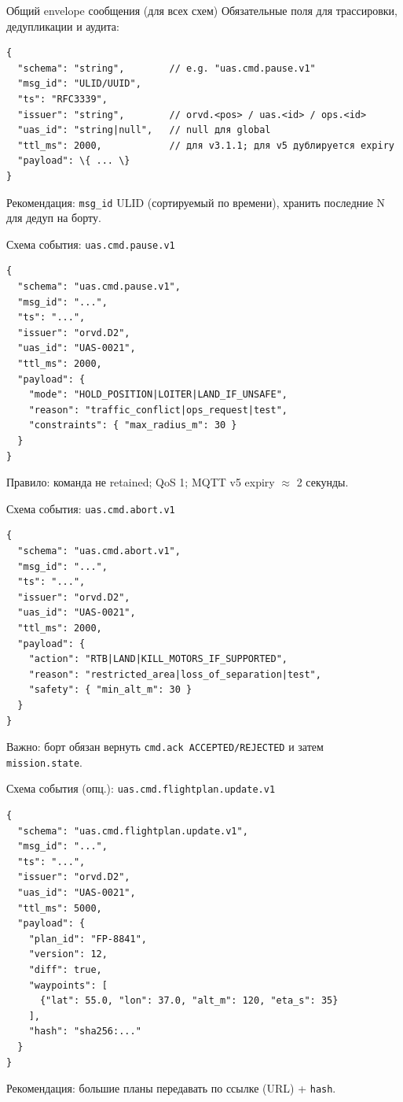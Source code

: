 \documentclass[aspectratio=169]{beamer}
\begin{document}
\begin{frame}[fragile]{Общий envelope сообщения (для всех схем)}
\small
Обязательные поля для трассировки, дедупликации и аудита:
\begin{Verbatim}[fontsize=\scriptsize, baselinestretch=0.85]
{
  "schema": "string",        // e.g. "uas.cmd.pause.v1"
  "msg_id": "ULID/UUID",
  "ts": "RFC3339",
  "issuer": "string",        // orvd.<pos> / uas.<id> / ops.<id>
  "uas_id": "string|null",   // null для global
  "ttl_ms": 2000,            // для v3.1.1; для v5 дублируется expiry
  "payload": \{ ... \}
}
\end{Verbatim}
Рекомендация: \texttt{msg\_id} ULID (сортируемый по времени), хранить последние N для дедуп на борту.
\end{frame}

\begin{frame}[fragile]{Схема события: \texttt{uas.cmd.pause.v1}}
\begin{Verbatim}[fontsize=\scriptsize, baselinestretch=0.85]
{
  "schema": "uas.cmd.pause.v1",
  "msg_id": "...",
  "ts": "...",
  "issuer": "orvd.D2",
  "uas_id": "UAS-0021",
  "ttl_ms": 2000,
  "payload": {
    "mode": "HOLD_POSITION|LOITER|LAND_IF_UNSAFE",
    "reason": "traffic_conflict|ops_request|test",
    "constraints": { "max_radius_m": 30 }
  }
}
\end{Verbatim}
Правило: команда не retained; QoS 1; MQTT v5 expiry $\approx$ 2 секунды.
\end{frame}

\begin{frame}[fragile]{Схема события: \texttt{uas.cmd.abort.v1}}
\begin{Verbatim}[fontsize=\scriptsize, baselinestretch=0.85]
{
  "schema": "uas.cmd.abort.v1",
  "msg_id": "...",
  "ts": "...",
  "issuer": "orvd.D2",
  "uas_id": "UAS-0021",
  "ttl_ms": 2000,
  "payload": {
    "action": "RTB|LAND|KILL_MOTORS_IF_SUPPORTED",
    "reason": "restricted_area|loss_of_separation|test",
    "safety": { "min_alt_m": 30 }
  }
}
\end{Verbatim}
Важно: борт обязан вернуть \texttt{cmd.ack ACCEPTED/REJECTED} и затем \texttt{mission.state}.
\end{frame}

\begin{frame}[fragile]{Схема события (опц.): \texttt{uas.cmd.flightplan.update.v1}}
\begin{Verbatim}[fontsize=\scriptsize, baselinestretch=0.85]
{
  "schema": "uas.cmd.flightplan.update.v1",
  "msg_id": "...",
  "ts": "...",
  "issuer": "orvd.D2",
  "uas_id": "UAS-0021",
  "ttl_ms": 5000,
  "payload": {
    "plan_id": "FP-8841",
    "version": 12,
    "diff": true,
    "waypoints": [
      {"lat": 55.0, "lon": 37.0, "alt_m": 120, "eta_s": 35}
    ],
    "hash": "sha256:..."
  }
}
\end{Verbatim}
Рекомендация: большие планы передавать по ссылке (URL) + \texttt{hash}.
\end{frame}
\end{document}

